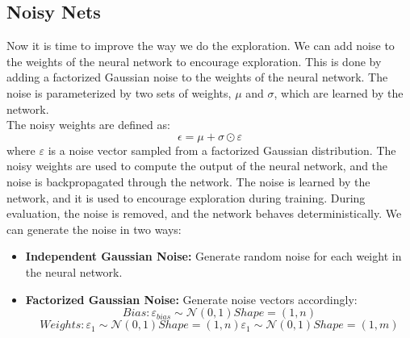 \documentclass[a4paper,12pt]{article}
\begin{document}
\subsection{Noisy Nets}
Now it is time to improve the way we do the exploration. We can add noise to the weights of the neural network to encourage exploration. This is done by adding a factorized Gaussian noise to the weights of the neural network. The noise is parameterized by two sets of weights, $\mu$ and $\sigma$, which are learned by the network.
\\ The noisy weights are defined as:
\[
\epsilon = \mu + \sigma \odot \varepsilon
\]
where $\varepsilon$ is a noise vector sampled from a factorized Gaussian distribution. The noisy weights are used to compute the output of the neural network, and the noise is backpropagated through the network.
The noise is learned by the network, and it is used to encourage exploration during training. During evaluation, the noise is removed, and the network behaves deterministically.
We can generate the noise in two ways:
\begin{itemize}
    
    \item \textbf{Independent Gaussian Noise:} Generate random noise for each weight in the neural network.
    \item\textbf{Factorized Gaussian Noise:} Generate noise vectors accordingly:
    \[
    Bias: \varepsilon_{bias} \sim \mathcal{N}(0, 1) Shape = (1, n)
    \]
    \[
    Weights: \varepsilon_{1} \sim \mathcal{N}(0, 1)  Shape = (1, n) 
    \varepsilon_{1} \sim \mathcal{N}(0, 1) Shape = (1, m)
    \]

\end{itemize}
\end{document}

